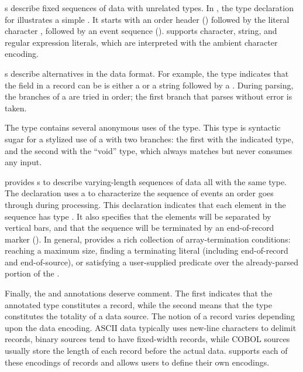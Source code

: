 
s describe fixed sequences of data with unrelated types.
In , the type declaration for 
illustrates a simple .  It starts with an order header
() followed by the literal character ,
followed by an event sequence ().  \pads{} supports
character, string, and regular expression literals, which are
interpreted with the ambient character encoding.

s describe alternatives in the data format.  For example,
the  type indicates
that the  field in a \dibbler{} record can be is either a
 or a string  followed by a .
During parsing, the branches of a  are tried in order; the
first branch that parses without error is taken.  

The  type contains several anonymous uses of the
 type.  This type is syntactic sugar for a stylized use of a
 with two branches: the first with the indicated type, and
the second with the ``void'' type, which always matches but never
consumes any input.

\pads{} provides s to describe varying-length sequences of
data all with the same type.  The  declaration uses a
 to characterize the sequence of events an order goes
through during processing.  This declaration indicates that each
element in the sequence has type .  It also specifies
that the elements will be separated by vertical bars, and that the
sequence will be terminated by an end-of-record marker ().
In general, \pads{} provides a rich collection of array-termination
conditions: reaching a maximum size, finding a terminating literal
(including end-of-record and end-of-source), or satisfying a
user-supplied predicate over the already-parsed portion of the
.

Finally, the  and  annotations deserve comment.  The first
indicates that the annotated type constitutes a record,
while the second means that the type constitutes the totality of a data source.  
The notion of a record varies depending upon the data encoding.  
ASCII data typically uses new-line characters to delimit 
records, binary sources tend to have fixed-width records, while 
COBOL sources usually store the length of each record before the actual data.
\pads{} supports each of these encodings of records and allows users to define
their own encodings.  

